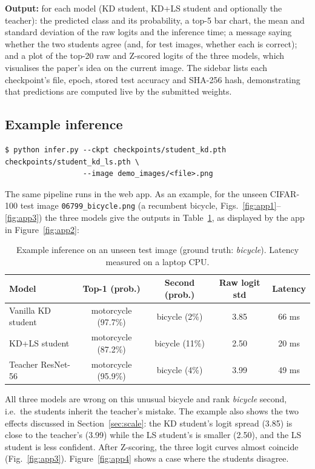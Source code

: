 \documentclass[12pt,a4paper]{article}
\begin{document}
\textbf{Output:} for each model (KD student, KD+LS student and optionally the teacher): the predicted class and its probability, a top-5 bar chart, the mean and standard deviation of the raw logits and the inference time; a message saying whether the two students agree (and, for test images, whether each is correct); and a plot of the top-20 raw and Z-scored logits of the three models, which visualises the paper's idea on the current image. The sidebar lists each checkpoint's file, epoch, stored test accuracy and SHA-256 hash, demonstrating that predictions are computed live by the submitted weights.

\subsection{Example inference}
\begin{lstlisting}
$ python infer.py --ckpt checkpoints/student_kd.pth checkpoints/student_kd_ls.pth \
                  --image demo_images/<file>.png
\end{lstlisting}
The same pipeline runs in the web app. As an example, for the unseen CIFAR-100 test image \texttt{06799\_bicycle.png} (a recumbent bicycle, Figs.~\ref{fig:app1}--\ref{fig:app3}) the three models give the outputs in Table~\ref{tab:example}, as displayed by the app in Figure~\ref{fig:app2}:

\begin{table}[H]
\centering
\caption{Example inference on an unseen test image (ground truth: \emph{bicycle}). Latency measured on a laptop CPU.}
\label{tab:example}
\begin{tabular}{lcccc}
\toprule
Model & Top-1 (prob.) & Second (prob.) & Raw logit std & Latency \\
\midrule
Vanilla KD student & motorcycle (97.7\%) & bicycle (2\%) & 3.85 & 66 ms \\
KD+LS student & motorcycle (87.2\%) & bicycle (11\%) & 2.50 & 20 ms \\
Teacher ResNet-56 & motorcycle (95.9\%) & bicycle (4\%) & 3.99 & 49 ms \\
\bottomrule
\end{tabular}
\end{table}
All three models are wrong on this unusual bicycle and rank \emph{bicycle} second, i.e.\ the students inherit the teacher's mistake. The example also shows the two effects discussed in Section~\ref{sec:scale}: the KD student's logit spread (3.85) is close to the teacher's (3.99) while the LS student's is smaller (2.50), and the LS student is less confident. After Z-scoring, the three logit curves almost coincide (Fig.~\ref{fig:app3}). Figure~\ref{fig:app4} shows a case where the students disagree.
\end{document}
